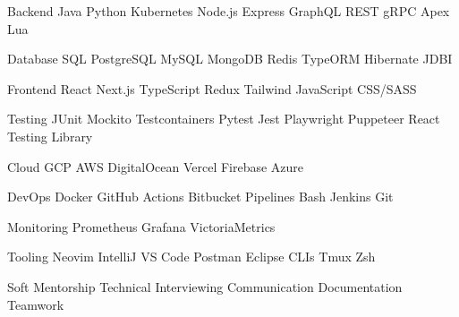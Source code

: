 

\begin{cvskills}

  \cvskill
    {Backend} %
    {Java \cpshalf Python \cpshalf Kubernetes \cpshalf Node.js \cpshalf Express \cpshalf GraphQL \cpshalf REST \cpshalf gRPC \cpshalf Apex \cpshalf Lua } %

  \cvskill
    {Database} %
    {SQL \cpshalf PostgreSQL \cpshalf MySQL \cpshalf MongoDB \cpshalf Redis \cpshalf TypeORM \cpshalf Hibernate \cpshalf JDBI} %

  \cvskill
    {Frontend} %
    {React \cpshalf Next.js \cpshalf TypeScript \cpshalf Redux \cpshalf Tailwind \cpshalf JavaScript \cpshalf CSS/SASS} %

  \cvskill
    {Testing} %
    {JUnit \cpshalf Mockito \cpshalf Testcontainers \cpshalf Pytest \cpshalf Jest \cpshalf Playwright \cpshalf Puppeteer \cpshalf React Testing Library} %

  \cvskill
    {Cloud} %
    {GCP \cpshalf AWS \cpshalf DigitalOcean \cpshalf Vercel \cpshalf Firebase \cpshalf Azure} %

  \cvskill
    {DevOps} %
    {Docker \cpshalf GitHub Actions \cpshalf Bitbucket Pipelines \cpshalf Bash \cpshalf Jenkins \cpshalf Git} %


  \cvskill
  {Monitoring} %
    {Prometheus \cpshalf Grafana \cpshalf VictoriaMetrics} %

  \cvskill
  {Tooling} %
    {Neovim \cpshalf IntelliJ \cpshalf VS Code \cpshalf Postman \cpshalf Eclipse \cpshalf CLIs \cpshalf Tmux \cpshalf Zsh} %

  \cvskill
  {Soft} %
    {Mentorship \cpshalf Technical Interviewing \cpshalf Communication \cpshalf Documentation \cpshalf Teamwork} %

\end{cvskills}
